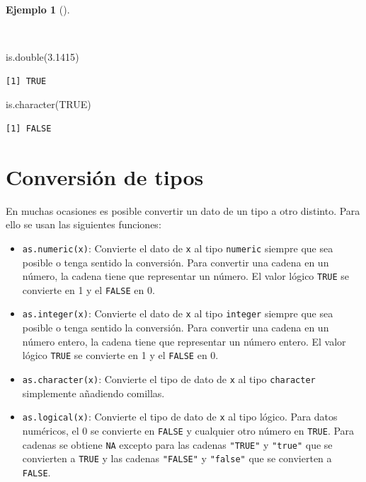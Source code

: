 \documentclass[
  spanish,
  a4paper,
]{scrreport}
\newenvironment{Shaded}{\begin{snugshade}}{\end{snugshade}}
\newcommand{\ConstantTok}[1]{\textcolor[rgb]{0.56,0.35,0.01}{#1}}
\newcommand{\FloatTok}[1]{\textcolor[rgb]{0.68,0.00,0.00}{#1}}
\newcommand{\FunctionTok}[1]{\textcolor[rgb]{0.28,0.35,0.67}{#1}}
\newcommand{\NormalTok}[1]{\textcolor[rgb]{0.00,0.23,0.31}{#1}}
\providecommand{\tightlist}{%
  \setlength{\itemsep}{0pt}\setlength{\parskip}{0pt}}
\theoremstyle{definition}
\theoremstyle{definition}
\newtheorem{example}{Ejemplo}[chapter]
\theoremstyle{remark}
\begin{document}
\begin{example}[]\protect\hypertarget{exm-tipos-datos-2}{}\label{exm-tipos-datos-2}

~

\begin{Shaded}
\begin{Highlighting}[]
\FunctionTok{is.double}\NormalTok{(}\FloatTok{3.1415}\NormalTok{)}
\end{Highlighting}
\end{Shaded}

\begin{verbatim}
[1] TRUE
\end{verbatim}

\begin{Shaded}
\begin{Highlighting}[]
\FunctionTok{is.character}\NormalTok{(}\ConstantTok{TRUE}\NormalTok{)}
\end{Highlighting}
\end{Shaded}

\begin{verbatim}
[1] FALSE
\end{verbatim}

\end{example}

\section{Conversión de tipos}\label{conversiuxf3n-de-tipos}

En muchas ocasiones es posible convertir un dato de un tipo a otro
distinto. Para ello se usan las siguientes funciones:

\begin{itemize}
\tightlist
\item
  \texttt{as.numeric(x)}: Convierte el dato de \texttt{x} al tipo
  \texttt{numeric} siempre que sea posible o tenga sentido la
  conversión. Para convertir una cadena en un número, la cadena tiene
  que representar un número. El valor lógico \texttt{TRUE} se convierte
  en 1 y el \texttt{FALSE} en 0.
\item
  \texttt{as.integer(x)}: Convierte el dato de \texttt{x} al tipo
  \texttt{integer} siempre que sea posible o tenga sentido la
  conversión. Para convertir una cadena en un número entero, la cadena
  tiene que representar un número entero. El valor lógico \texttt{TRUE}
  se convierte en 1 y el \texttt{FALSE} en 0.
\item
  \texttt{as.character(x)}: Convierte el tipo de dato de \texttt{x} al
  tipo \texttt{character} simplemente añadiendo comillas.
\item
  \texttt{as.logical(x)}: Convierte el tipo de dato de \texttt{x} al
  tipo lógico. Para datos numéricos, el 0 se convierte en \texttt{FALSE}
  y cualquier otro número en \texttt{TRUE}. Para cadenas se obtiene
  \texttt{NA} excepto para las cadenas \texttt{"TRUE"} y \texttt{"true"}
  que se convierten a \texttt{TRUE} y las cadenas \texttt{"FALSE"} y
  \texttt{"false"} que se convierten a \texttt{FALSE}.
\end{itemize}
\end{document}
